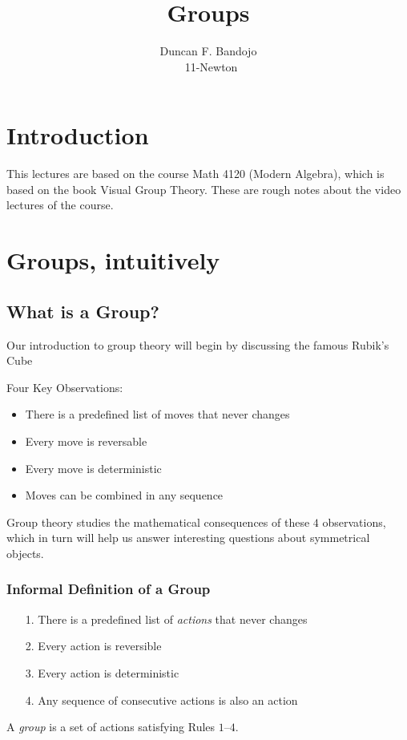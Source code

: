 \documentclass{article}
\title{Groups}
\author{Duncan F. Bandojo \\\ 11-Newton}
\begin{document}
\maketitle

\tableofcontents
\setcounter{section}{-1}
\section{Introduction}
This lectures are based on the course Math 4120 (Modern Algebra), which is based
on the book Visual Group Theory. These are rough notes about the video lectures
of the course.

\section{Groups, intuitively}
\subsection{What is a Group?}
Our introduction to group theory will begin by discussing the famous Rubik’s
Cube

Four Key Observations:
\begin{itemize}
        \item There is a predefined list of moves that never changes
        \item Every move is reversable
        \item Every move is deterministic
        \item Moves can be combined in any sequence 
\end{itemize}
Group theory studies the mathematical consequences of these $4$ observations, which
in turn will help us answer interesting questions about symmetrical objects.

\subsubsection{Informal Definition of a Group}
\begin{itemize}
     \item[1.] There is a predefined list of \emph{actions} that never changes
     \item[2.] Every action is reversible
     \item[3.] Every action is deterministic
     \item[4.] Any sequence of consecutive actions is also an action
\end{itemize}
\begin{defi}[Informal]
     A \emph{group} is a set of actions satisfying Rules $1–4$.
\end{defi}
\end{document}
